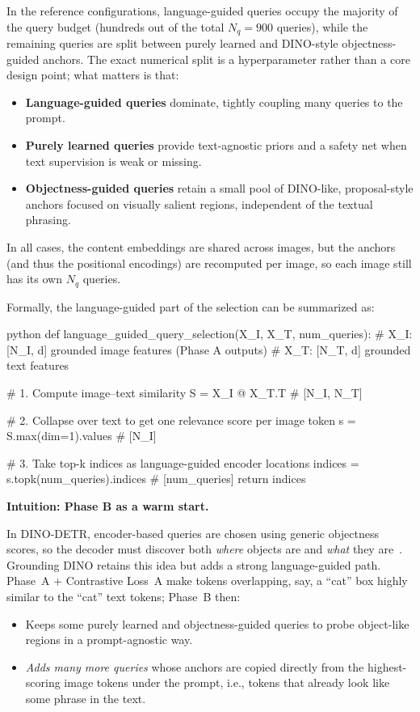 \begin{enrichment}
\begin{enrichment}[Method][subsection]
		In the reference configurations, language-guided queries occupy the majority of the query budget (hundreds out of the total \(N_q = 900\) queries), while the remaining queries are split between purely learned and DINO-style objectness-guided anchors. The exact numerical split is a hyperparameter rather than a core design point; what matters is that:
		\begin{itemize}
			\item \textbf{Language-guided queries} dominate, tightly coupling many queries to the prompt.
			\item \textbf{Purely learned queries} provide text-agnostic priors and a safety net when text supervision is weak or missing.
			\item \textbf{Objectness-guided queries} retain a small pool of DINO-like, proposal-style anchors focused on visually salient regions, independent of the textual phrasing.
		\end{itemize}
		In all cases, the content embeddings are shared across images, but the anchors (and thus the positional encodings) are recomputed per image, so each image still has its own \(N_q\) queries.
		
		Formally, the language-guided part of the selection can be summarized as:
		\begin{mintedbox}{python}
			def language_guided_query_selection(X_I, X_T, num_queries):
			    # X_I: [N_I, d] grounded image features (Phase A outputs)
			    # X_T: [N_T, d] grounded text features
			
			    # 1. Compute image–text similarity
			    S = X_I @ X_T.T              # [N_I, N_T]
			
			    # 2. Collapse over text to get one relevance score per image token
			    s = S.max(dim=1).values      # [N_I]
			
			    # 3. Take top-k indices as language-guided encoder locations
			    indices = s.topk(num_queries).indices  # [num_queries]
			    return indices
		\end{mintedbox}
		
		\noindent\textbf{Intuition: Phase B as a warm start.}
		
		In DINO-DETR, encoder-based queries are chosen using generic objectness scores, so the decoder must discover both \emph{where} objects are and \emph{what} they are~\cite{zhang2022_dino}. Grounding DINO retains this idea but adds a strong language-guided path. Phase~A + Contrastive Loss~A make tokens overlapping, say, a ``cat'' box highly similar to the ``cat'' text tokens; Phase~B then:
		\begin{itemize}
			\item Keeps some purely learned and objectness-guided queries to probe object-like regions in a prompt-agnostic way.
			\item \emph{Adds many more queries} whose anchors are copied directly from the highest-scoring image tokens under the prompt, i.e., tokens that already look like some phrase in the text.
		\end{itemize}
		

\end{enrichment}
\end{enrichment}
